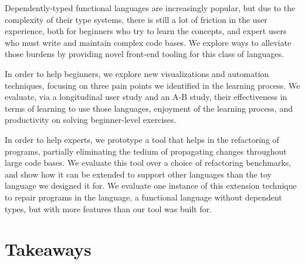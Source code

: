 \documentclass[12pt]{ucsddissertation}
\begin{document}
\begin{dissertationabstract}

Dependently-typed functional languages are increasingly popular, but due to the
complexity of their type systems, there is still a lot of friction in the user
experience, both for beginners who try to learn the concepts, and expert users
who must write and maintain complex code bases.  We explore ways to alleviate
those burdens by providing novel front-end tooling for this class of languages.

In order to help beginners, we explore new visualizations and automation
techniques, focusing on three pain points we identified in the learning process.
We evaluate, via a longitudinal user study and an A-B study, their effectiveness
in terms of learning to use those languages, enjoyment of the learning process,
and productivity on solving beginner-level exercises.

In order to help experts, we prototype a tool that helps in the refactoring of
programs, partially eliminating the tedium of propagating changes throughout
large code bases.  We evaluate this tool over a choice of refactoring
benchmarks, and show how it can be extended to support other languages than the
toy language we designed it for.  We evaluate one instance of this extension
technique to repair programs in the \OCaml{} language, a functional language
without dependent types, but with more features than our tool was built for.

\end{dissertationabstract}

\mainmatter

\begin{dissertationintroduction}




\end{dissertationintroduction}





\chapter{Takeaways}

\appendix



\backmatter

\end{document}
